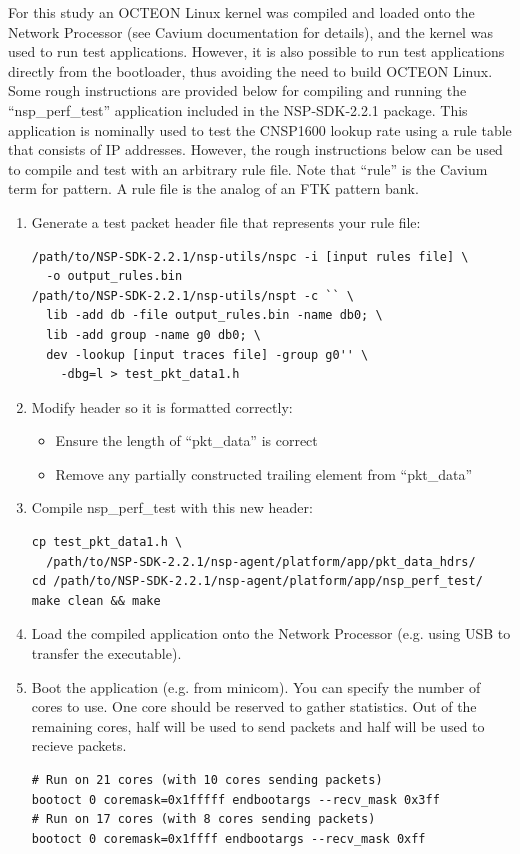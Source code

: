 \documentclass[preprint,prd,showpacs]{revtex4-1}
\begin{document}
For this study an OCTEON Linux kernel was compiled and loaded onto the Network Processor (see Cavium documentation for details), and the kernel was used to run test applications. However, it is also possible to run test applications directly from the bootloader, thus avoiding the need to build OCTEON Linux. Some rough instructions are provided below for compiling and running the ``nsp\_perf\_test'' application included in the NSP-SDK-2.2.1 package. This application is nominally used to test the CNSP1600 lookup rate using a rule table that consists of IP addresses. However, the rough instructions below can be used to compile and test with an arbitrary rule file. Note that ``rule'' is the Cavium term for pattern. A rule file is the analog of an FTK pattern bank.
\begin{enumerate}
\item Generate a test packet header file that represents your rule file:
  \begin{lstlisting}
/path/to/NSP-SDK-2.2.1/nsp-utils/nspc -i [input rules file] \
  -o output_rules.bin
/path/to/NSP-SDK-2.2.1/nsp-utils/nspt -c `` \
  lib -add db -file output_rules.bin -name db0; \
  lib -add group -name g0 db0; \
  dev -lookup [input traces file] -group g0'' \
    -dbg=l > test_pkt_data1.h
  \end{lstlisting}
\item Modify header so it is formatted correctly:
  \begin{itemize}
  \item Ensure the length of ``pkt\_data'' is correct
  \item Remove any partially constructed trailing element from ``pkt\_data''
  \end{itemize}
\item Compile nsp\_perf\_test with this new header:
  \begin{lstlisting}
cp test_pkt_data1.h \
  /path/to/NSP-SDK-2.2.1/nsp-agent/platform/app/pkt_data_hdrs/
cd /path/to/NSP-SDK-2.2.1/nsp-agent/platform/app/nsp_perf_test/
make clean && make
  \end{lstlisting}
\item Load the compiled application onto the Network Processor (e.g. using USB to transfer the executable).
\item Boot the application (e.g. from minicom). You can specify the number of cores to use. One core should be reserved to gather statistics. Out of the remaining cores, half will be used to send packets and half will be used to recieve packets.
  \begin{lstlisting}
# Run on 21 cores (with 10 cores sending packets)
bootoct 0 coremask=0x1fffff endbootargs --recv_mask 0x3ff
# Run on 17 cores (with 8 cores sending packets)
bootoct 0 coremask=0x1ffff endbootargs --recv_mask 0xff
  \end{lstlisting}
\end{enumerate}
\end{document}
